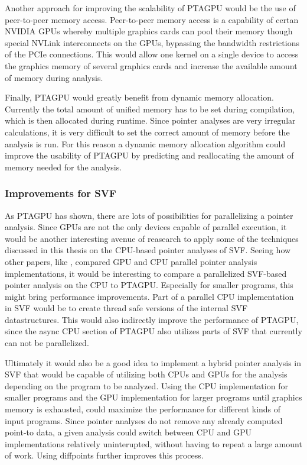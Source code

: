 Another approach for improving the scalability of PTAGPU would be the use of peer-to-peer memory access.
Peer-to-peer memory access is a capability of certan NVIDIA GPUs whereby multiple graphics cards can pool their memory though special NVLink interconnects on the GPUs, bypassing the bandwidth restrictions of the PCIe connections.
This would allow one kernel on a single device to access the graphics memory of several graphics cards and increase the available amount of memory during analysis.

Finally, PTAGPU would greatly benefit from dynamic memory allocation. Currently the total amount of unified memory has to be set during compilation, which is then allocated during runtime.
Since pointer analyses are very irregular calculations, it is very difficult to set the correct amount of memory before the analysis is run.
For this reason a dynamic memory allocation algorithm could improve the usability of PTAGPU by predicting and reallocating the amount of memory needed for the analysis.

\subsubsection{Improvements for SVF}
As PTAGPU has shown, there are lots of possibilities for parallelizing a pointer analysis.
Since GPUs are not the only devices capable of parallel execution, it would be another interesting avenue of reasearch to apply some of the techniques discussed in this thesis on the CPU-based pointer analyses of SVF.
Seeing how other papers, like \cite{mendez2012gpu}, compared GPU and CPU parallel pointer analysis implementations, it would be interesting to compare a parallelized SVF-based pointer analysis on the CPU to PTAGPU. Especially for smaller programs, this might bring performance improvements.
Part of a parallel CPU implementation in SVF would be to create thread safe versions of the internal SVF datastructures.
This would also indirectly improve the performance of PTAGPU, since the async CPU section of PTAGPU also utilizes parts of SVF that currently can not be parallelized.

Ultimately it would also be a good idea to implement a hybrid pointer analysis in SVF that would be capable of utilizing both CPUs and GPUs for the analysis depending on the program to be analyzed.
Using the CPU implementation for smaller programs and the GPU implementation for larger programs until graphics memory is exhausted, could maximize the performance for different kinds of input programs.
Since pointer analyses do not remove any already computed point-to data, a given analysis could switch between CPU and GPU implementations relatively uninterupted, without having to repeat a large amount of work.
Using diffpoints further improves this process.


